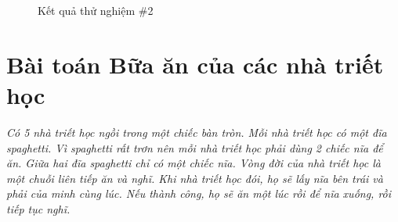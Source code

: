 \documentclass{article}
\begin{document}
\begin{figure}[h]
    \centering

    \caption{Kết quả thử nghiệm \#2}
\end{figure}

\section{Bài toán Bữa ăn của các nhà triết học}
\textit{Có 5 nhà triết học ngồi trong một chiếc bàn tròn. Mỗi nhà triết học có một đĩa spaghetti. Vì spaghetti
    rất trơn nên mỗi nhà triết học phải dùng 2 chiếc nĩa để ăn. Giữa hai đĩa spaghetti chỉ có một chiếc nĩa.
    Vòng đời của nhà triết học là một chuỗi liên tiếp ăn và nghĩ. Khi nhà triết học đói, họ sẽ lấy nĩa bên trái
    và phải của minh cùng lúc. Nếu thành công, họ sẽ ăn một lúc rồi để nĩa xuống, rồi tiếp tục nghĩ.} \\
\end{document}
